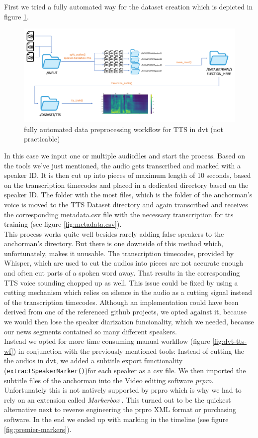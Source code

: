 \documentclass[
  a4paper,  %
  twoside,  %
  bibliography=totoc,
  headsepline,
  cleardoublepage=empty,
  parskip=half,
  draft=false
]{scrbook}
\begin{document}
First we tried a fully automated way for the dataset creation which is depicted in figure \ref{fig:dvt-tts-original}.
\begin{figure}[h]
  \centering
  \includegraphics[width=1\textwidth]{./graphics/images/tts/tts dvt only.png}
  \caption{fully automated data preprocessing workflow for TTS in \gls{dvt} (not practicable)}
  \label{fig:dvt-tts-original}
\end{figure}
In this case we input one or multiple audiofiles and start the process. Based on the tools we've just mentioned, the audio gets transcribed and marked with a speaker ID.
It is then cut up into pieces of maximum length of 10 seconds, based on the transcription timecodes and placed in a dedicated directory based on the speaker ID. The folder with the most files, which is the folder of the anchorman's voice is moved to the TTS Dataset directory and again transcribed and receives the corresponding metadata.csv file with the necessary transcription for tts training (see figure \ref{fig:metadata.csv}). \\
This process works quite well besides rarely adding false speakers to the anchorman's directory. But there is one downside of this method which, unfortunately, makes it unusable. The transcription timecodes, provided by Whisper, which are used to cut the audios into pieces are not accurate enough and often cut parts of a spoken word away. That results in the corresponding TTS voice sounding chopped up as well. This issue could be fixed by using a cutting mechanism which relies on silence in the audio as a cutting signal instead of the transcription timecodes. Although an implementation could have been derived from one of the referenced github projects, we opted against it, because we would then lose the speaker diarization funcionality, which we needed, because our news segments contained so many different speakers. \\
Instead we opted for more time consuming manual workflow (figure \ref{fig:dvt-tts-wf}) in conjunction with the previously mentioned tools: Instead of cutting the the audios in \gls{dvt}, we added a subtitle export functionality (\verb|extractSpeakerMarker()|)for each speaker as a csv file. We then imported the subtitle files of the anchorman into the Video editing software \textit{\gls{prpro}}. Unfortunately this is not natively supported by \gls{prpro} which is why we had to rely on an extension called \textit{Markerbox} \cite{montgomeryMARKERBOXFreeMarker}. This turned out to be the quickest alternative next to reverse engineering the \gls{prpro} XML format or purchasing software. In the end we ended up with marking in the timeline (see figure \ref{fig:premier-markers}). 
\end{document}
